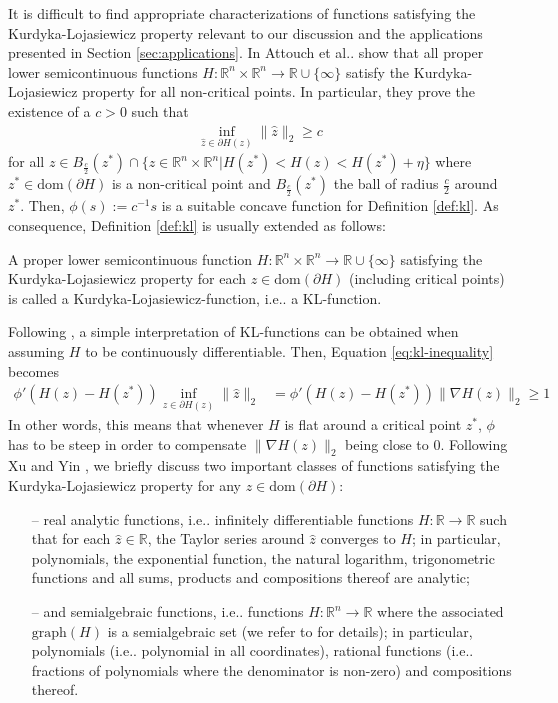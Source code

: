 \documentclass[onecolumn,final,a4paper,13pt,reqno]{siamart}
\makeatletter
\DeclareRobustCommand\onedot{\futurelet\@let@token\@onedot}
\def\@onedot{\ifx\@let@token.\else.\null\fi\xspace}
\def\ie{{i.e}\onedot} \def\Ie{{I.e}\onedot}
\def\etal{{et al}\onedot}
\def\dom{\text{dom}}
\makeatother
\begin{document}
It is difficult to find appropriate characterizations of functions satisfying the Kurdyka-Lojasiewicz property relevant to our discussion and the applications presented in Section \ref{sec:applications}. In \cite{AttouchBolteRedontSoubeyran:2010} Attouch \etal show that all proper lower semicontinuous functions $H : \mathbb{R}^n \times \mathbb{R}^n \rightarrow \mathbb{R} \cup \{\infty\}$ satisfy the Kurdyka-Lojasiewicz property for all non-critical points. In particular, they prove the existence of a $c > 0$ such that
\begin{align}
	\inf_{\hat{z} \in \partial H(z)} \|\hat{z}\|_2 \geq c
\end{align}
for all $z \in B_{\frac{c}{2}}(z^\ast) \cap \{z \in \mathbb{R}^n \times \mathbb{R}^n | H(z^\ast) < H(z) < H(z^\ast) + \eta\}$ where $z^\ast \in \dom(\partial H)$ is a non-critical point and $B_{\frac{c}{2}}(z^\ast)$ the ball of radius $\frac{c}{2}$ around $z^\ast$. Then, $\phi(s) := c^{-1}s$ is a suitable concave function for Definition \ref{def:kl}. As consequence, Definition \ref{def:kl} is usually extended as follows:

\begin{definitionmd}
	A proper lower semicontinuous function $H : \mathbb{R}^n \times \mathbb{R}^n \rightarrow \mathbb{R} \cup \{\infty\}$ satisfying the Kurdyka-Lojasiewicz property for each $z \in \dom (\partial H)$ (including critical points) is called a Kurdyka-Lojasiewicz-function, \ie a KL-function.
\end{definitionmd}

Following \cite{FrankelGarrigosPeypuquet:2015}, a simple interpretation of KL-functions can be obtained when assuming $H$ to be continuously differentiable. Then, Equation \eqref{eq:kl-inequality} becomes
\begin{align}
	\phi'(H(z) - H(z^\ast)) \inf_{\hat{z} \in \partial H(z)}\|\hat{z}\|_2 &= \phi'(H(z) - H(z^\ast)) \|\nabla H(z)\|_2 \geq 1
\end{align}
In other words, this means that whenever $H$ is flat around a critical point $z^\ast$, $\phi$ has to be steep in order to compensate $\|\nabla H(z)\|_2$ being close to $0$. Following Xu and Yin \cite{XuYin:2013}, we briefly discuss two important classes of functions satisfying the Kurdyka-Lojasiewicz property for any $z \in \dom (\partial H)$:
\begin{itemize}
	\item[--] real analytic functions, \ie infinitely differentiable functions $H: \mathbb{R} \rightarrow \mathbb{R}$ such that for each $\hat{z} \in \mathbb{R}$, the Taylor series around $\hat{z}$ converges to $H$; in particular, polynomials, the exponential function, the natural logarithm, trigonometric functions and all sums, products and compositions thereof are analytic;
	\item[--] and semialgebraic functions, \ie functions $H : \mathbb{R}^n \rightarrow \mathbb{R}$ where the associated  $\text{graph}(H)$ is a semialgebraic set (we refer to \cite{Coste:2002} for details); in particular, polynomials (\ie polynomial in all coordinates),  rational functions (\ie fractions of polynomials where the denominator is non-zero) and compositions thereof.
\end{itemize}
\end{document}
